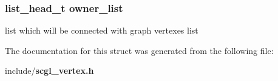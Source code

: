 \subsubsection[{owner\-\_\-list}]{\setlength{\rightskip}{0pt plus 5cm}list\-\_\-head\-\_\-t {\bf owner\-\_\-list}}\label{structscgl__vertex_a6e2f0c2302d0b754a3ee6bb58072829a}
list which will be connected with graph vertexes list 

The documentation for this struct was generated from the following file\-:\begin{DoxyCompactItemize}
\item 
include/{\bf scgl\-\_\-vertex.\-h}\end{DoxyCompactItemize}
